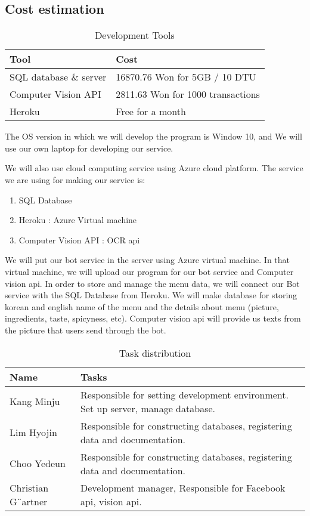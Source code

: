 \subsection{Cost estimation}
\begin{table}[htb]
\caption{Development Tools}
\begin{tabularx}{\linewidth}{|X|X|}
\toprule
Tool & Cost \\
\midrule
SQL database \& server & 16870.76 Won  for 5GB / 10 DTU\\
Computer Vision API & 2811.63 Won for 1000 transactions\\
Heroku & Free for a month
\end{tabularx}
\end{table}
\FloatBarrier

The OS version in which we will develop the program is Window 10, and We will use our own laptop for developing our service.

We will also use cloud computing service using Azure cloud platform. 
The service we are using for making our service is:
\begin{enumerate}
\item SQL Database 
\item Heroku  : Azure Virtual machine
\item Computer Vision API : OCR api
\end{enumerate}
We will put our bot service in the server using Azure virtual machine. In that virtual machine, we will upload our program for our bot service and Computer vision api.  
In order to store and manage the menu data, we will connect our Bot service with the SQL Database from Heroku. We will make database for storing korean and english name of the menu and the details about menu (picture, ingredients, taste, spicyness, etc).
Computer vision api will provide us texts from the picture that users send through the bot.

\begin{table}[htb]
\caption{Task distribution}
\begin{tabularx}{\linewidth}{|X|X|}
\toprule
Name & Tasks \\
\midrule
Kang Minju  & Responsible for setting development environment. Set up server, manage database.\\
Lim Hyojin & Responsible for constructing databases, registering data and documentation.\\
Choo Yedeun & Responsible for constructing databases, registering data and documentation.\\
Christian G¨artner & Development manager, Responsible for Facebook api, vision api.
\end{tabularx}
\end{table}
\FloatBarrier
